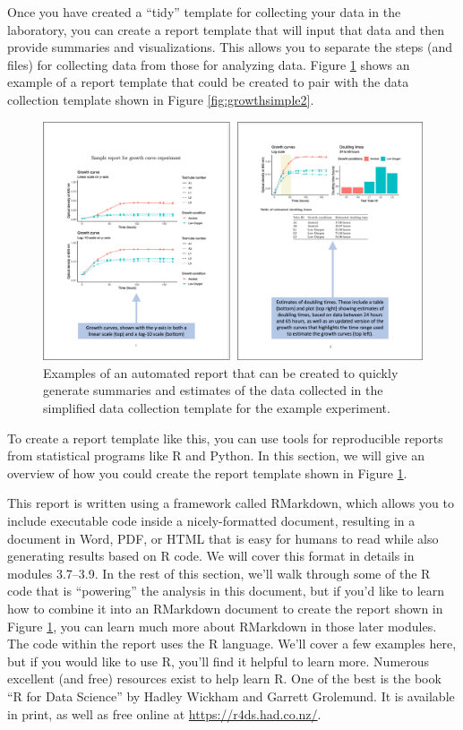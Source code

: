 \documentclass[]{tufte-book}
\begin{document}
Once you have created a ``tidy'' template for collecting your data in the laboratory,
you can create a report template that will input that data and then provide summaries
and visualizations. This allows you to separate the steps (and files) for collecting data
from those for analyzing data. Figure \ref{fig:growthreport2} shows an example of
a report template that could be created to pair with the data collection template shown
in Figure \ref{fig:growthsimple2}.

\begin{figure}
\includegraphics[width=\textwidth]{figures/growth_curve_report} \caption[Examples of an automated report that can be created to quickly generate summaries and estimates of the data collected in the simplified data collection template for the example experiment]{Examples of an automated report that can be created to quickly generate summaries and estimates of the data collected in the simplified data collection template for the example experiment.}\label{fig:growthreport2}
\end{figure}

To create a report template like this, you can use tools for reproducible
reports from statistical programs like R and Python. In this section, we will
give an overview of how you could create the report template shown in Figure
\ref{fig:growthreport2}.

This report is written using a framework called RMarkdown, which allows you to
include executable code inside a nicely-formatted document, resulting in a
document in Word, PDF, or HTML that is easy for humans to read while also
generating results based on R code. We will cover this format in details in
modules 3.7--3.9. In the rest of this section, we'll walk through some of the R
code that is ``powering'' the analysis in this document, but if you'd like to
learn how to combine it into an RMarkdown document to create the report shown in
Figure \ref{fig:growthreport2}, you can learn much more about RMarkdown in
those later modules. The code within the report uses the R language. We'll cover
a few examples here, but if you would like to use R, you'll find it helpful to
learn more. Numerous excellent (and free) resources exist to help learn R. One
of the best is the book ``R for Data Science'' by Hadley Wickham and Garrett
Grolemund. It is available in print, as well as free online at
\url{https://r4ds.had.co.nz/}.
\end{document}

